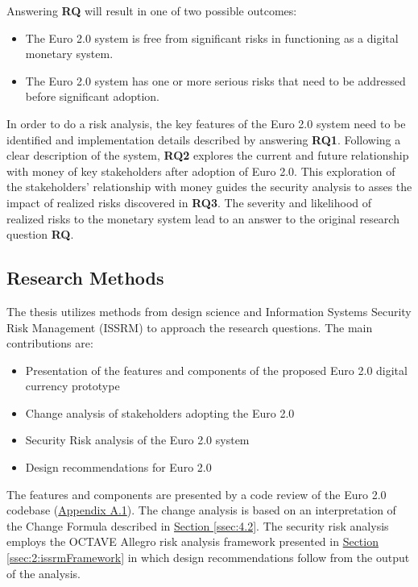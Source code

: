 \documentclass[a4paper,12pt]{article} %
\newcommand{\hypersectionref}[1]{\hyperref[#1]{Section \ref{#1}}}
\begin{document}
Answering \textbf{RQ} will result in one of two possible outcomes:
\begin{itemize}
	\item The Euro 2.0 system is free from significant risks in functioning as a digital monetary system.
	\item The Euro 2.0 system has one or more serious risks that need to be addressed before significant adoption.
\end{itemize}

In order to do a risk analysis, the key features of the Euro 2.0 system need to be identified and implementation details described by answering \textbf{RQ1}. Following a clear description of the system, \textbf{RQ2} explores the current and future relationship with money of key stakeholders after adoption of Euro 2.0. This exploration of the stakeholders' relationship with money guides the security analysis to asses the impact of realized risks discovered in \textbf{RQ3}. The severity and likelihood of realized risks to the monetary system lead to an answer to the original research question \textbf{RQ}.

\subsection{Research Methods} \label{ssec:1.3}
The thesis utilizes methods from design science and Information Systems Security Risk Management (ISSRM) to approach the research questions. The main contributions are:
\begin{itemize}
	\item Presentation of the features and components of the proposed Euro 2.0 digital currency prototype
	\item Change analysis of stakeholders adopting the Euro 2.0
	\item Security Risk analysis of the Euro 2.0 system
	\item Design recommendations for Euro 2.0
\end{itemize}

The features and components are presented by a code review of the Euro 2.0 codebase (\hyperref[ssec:a.1]{Appendix A.1}). The change analysis is based on an interpretation of the Change Formula\cite{changeFormula2014} described in \hypersectionref{ssec:4.2}. The security risk analysis employs the OCTAVE Allegro risk analysis framework presented in \hypersectionref{ssec:2:issrmFramework} in which design recommendations follow from the output of the analysis.
\end{document}

